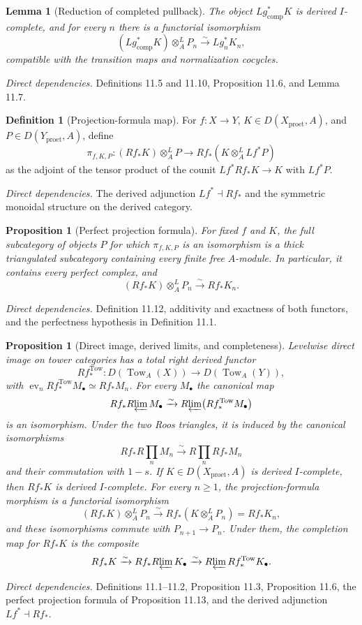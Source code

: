 \documentclass[10pt]{article}
\newtheorem{proposition}[theorem]{Proposition}
\newtheorem{lemma}[theorem]{Lemma}
\theoremstyle{definition}
\newtheorem{definition}[theorem]{Definition}
\newcommand{\Rlim}{R\!\varprojlim}
\newcommand{\Proet}{\mathrm{proet}}
\newcommand{\deps}[1]{\par\smallskip\textit{Direct dependencies.} #1\par}
\begin{document}
\begin{lemma}[Reduction of completed pullback]
The object $Lg^*_{\mathrm{comp}}K$ is derived $I$-complete, and for every
$n$ there is a functorial isomorphism
\[
 (Lg^*_{\mathrm{comp}}K)\otimes_A^LP_n
 \xrightarrow{\sim}Lg_n^*K_n,
\]
compatible with the transition maps and normalization cocycles.
\end{lemma}
\deps{Definitions 11.5 and 11.10, Proposition 11.6, and Lemma 11.7.}

\begin{definition}[Projection-formula map]
For $f:X\to Y$, $K\in D(X_{\Proet},A)$, and
$P\in D(Y_{\Proet},A)$, define
\[
 \pi_{f,K,P}:(Rf_*K)\otimes_A^LP
 \longrightarrow Rf_*(K\otimes_A^LLf^*P)
\]
as the adjoint of the tensor product of the counit
$Lf^*Rf_*K\to K$ with $Lf^*P$.
\end{definition}
\deps{The derived adjunction $Lf^*\dashv Rf_*$ and the symmetric monoidal
structure on the derived category.}

\begin{proposition}[Perfect projection formula]
For fixed $f$ and $K$, the full subcategory of objects $P$ for which
$\pi_{f,K,P}$ is an isomorphism is a thick triangulated subcategory
containing every finite free $A$-module.  In particular, it contains every
perfect complex, and
\[
 (Rf_*K)\otimes_A^LP_n\xrightarrow{\sim}Rf_*K_n.
\]
\end{proposition}
\deps{Definition 11.12, additivity and exactness of both functors, and the
perfectness hypothesis in Definition 11.1.}

\begin{proposition}[Direct image, derived limits, and completeness]
Levelwise direct image on tower categories has a total right derived
functor
\[
 Rf_*^{\operatorname{Tow}}:
 D(\operatorname{Tow}_{A}(X))
 \longrightarrow D(\operatorname{Tow}_{A}(Y)),
\]
with
$\operatorname{ev}_nRf_*^{\operatorname{Tow}}M_\bullet
\simeq Rf_*M_n$.  For every $M_\bullet$ the canonical map
\[
 Rf_*\Rlim M_\bullet
 \xrightarrow{\sim}
 \Rlim\bigl(Rf_*^{\operatorname{Tow}}M_\bullet\bigr)
\]
is an isomorphism.  Under the two Roos triangles, it is induced by the
canonical isomorphisms
\[
 Rf_*R\!\prod_nM_n\xrightarrow{\sim}
 R\!\prod_nRf_*M_n
\]
and their commutation with $1-s$.
If $K\in D(X_{\Proet},A)$ is derived $I$-complete,
then $Rf_*K$ is derived $I$-complete.  For every $n\geq1$, the
projection-formula morphism is a functorial isomorphism
\[
 (Rf_*K)\otimes_A^LP_n
 \xrightarrow{\sim}Rf_*(K\otimes_A^LP_n)=Rf_*K_n,
\]
and these isomorphisms commute with $P_{n+1}\to P_n$.  Under them, the
completion map for $Rf_*K$ is the composite
\[
 Rf_*K\xrightarrow{\sim}Rf_*\Rlim K_\bullet
 \xrightarrow{\sim}\Rlim Rf_*^{\operatorname{Tow}}K_\bullet.
\]
\end{proposition}
\deps{Definitions 11.1--11.2, Proposition 11.3, Proposition 11.6, the
perfect projection formula of Proposition 11.13, and the derived
adjunction $Lf^*\dashv Rf_*$.}
\end{document}
